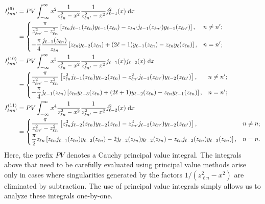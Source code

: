 \begin{equation}
\begin{split}
I^{(9)}_{\ell nn'} &= PV\int_{-\infty}^\infty x^2\frac{1}{z_{\ell n}^2 - x^2}\frac{1}{z_{\ell n'}^2 - x^2}j_{\ell - 1}^2(x)\;\mathrm{d}x\\
&=
\begin{dcases}
\frac{\pi}{z_{\ell n'}^2 - z_{\ell n}^2}\left[z_{\ell n}j_{\ell - 1}(z_{\ell n})y_{\ell - 1}(z_{\ell n}) - z_{\ell n'}j_{\ell - 1}(z_{\ell n'})y_{\ell - 1}(z_{\ell n'})\right], & n\neq n';\\
-\frac{\pi}{4}\frac{j_{\ell - 1}(z_{\ell n})}{z_{\ell n}}\left[z_{\ell n}y_{\ell - 2}(z_{\ell n}) + (2\ell - 1)y_{\ell - 1}(z_{\ell n}) - z_{\ell n}y_\ell(z_{\ell n})\right], & n = n';
\end{dcases}\\ 
I^{(10)}_{\ell nn'} &= PV\int_{-\infty}^\infty x^3\frac{1}{z_{\ell n}^2 - x^2}\frac{1}{z_{\ell n'}^2 - x^2}j_{\ell - 1}(x)j_{\ell - 2}(x)\;\mathrm{d}x\\
&= 
\begin{dcases}
\frac{\pi}{z_{\ell n'}^2 - z_{\ell n}^2}\left[z_{\ell n}^2j_{\ell - 1}(z_{\ell n})y_{\ell - 2}(z_{\ell n}) - z_{\ell n'}^2j_{\ell - 1}(z_{\ell n'})y_{\ell - 2}(z_{\ell n'})\right], & n\neq n';\\
-\frac{\pi}{4}j_{\ell - 1}(z_{\ell n})\left[z_{\ell n}y_{\ell - 3}(z_{\ell n}) + (2\ell + 1)y_{\ell - 2}(z_{\ell n}) - z_{\ell n}y_{\ell - 1}(z_{\ell n})\right], & n=n';
\end{dcases}\\
I^{(11)}_{\ell nn'} &= PV\int_{-\infty}^\infty x^4\frac{1}{z_{\ell n}^2 - x^2}\frac{1}{z_{\ell n'}^2 - x^2}j_{\ell - 2}^2(x)\;\mathrm{d}x\\
&= 
\begin{dcases}
\frac{\pi}{z_{\ell n'}^2 - z_{\ell n}^2}\left[z_{\ell n}^3j_{\ell - 2}(z_{\ell n})y_{\ell - 2}(z_{\ell n}) - z_{\ell n'}^3j_{\ell - 2}(z_{\ell n'})y_{\ell - 2}(z_{\ell n'})\right], & n\neq n;\\
\frac{\pi}{2}z_{\ell n}\left[z_{\ell n}j_{\ell - 1}(z_{\ell n})y_{\ell - 2}(z_{\ell n}) - 2j_{\ell - 2}(z_{\ell n})y_{\ell - 2}(z_{\ell n}) - z_{\ell n}j_{\ell - 2}(z_{\ell n})y_{\ell - 3}(z_{\ell n})\right], & n = n.
\end{dcases}
\end{split}
\end{equation}
Here, the prefix $PV$ denotes a Cauchy principal value integral. The integrals above that need to be carefully evaluated using principal value methods arise only in cases where singularities generated by the factors $1/(z_{\ell n}^2 - x^2)$ are eliminated by subtraction. The use of principal value integrals simply allows us to analyze these integrals one-by-one.

